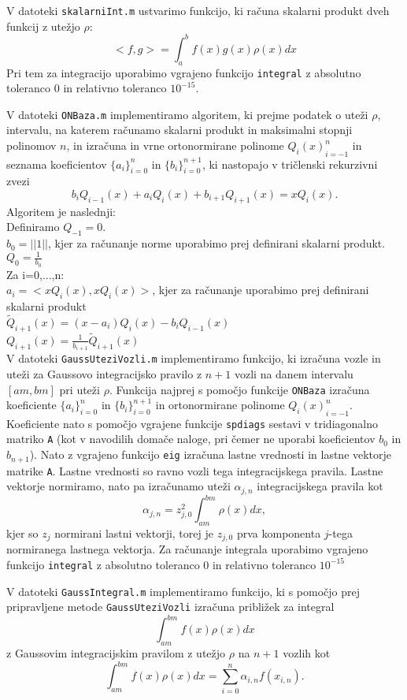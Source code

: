 \documentclass[a4paper,12pt]{article}
\begin{document}
V datoteki \texttt{skalarniInt.m} ustvarimo funkcijo, ki računa skalarni produkt 
dveh funkcij z utežjo $\rho$:
$$<f,g>=\int_a^b f(x)g(x)\rho(x)dx$$
Pri tem za integracijo uporabimo vgrajeno funkcijo \texttt{integral} z absolutno 
toleranco $0$ in relativno toleranco $10^{-15}$.

V datoteki \texttt{ONBaza.m} implementiramo algoritem, ki prejme podatek o uteži $\rho$, 
intervalu, na katerem računamo skalarni produkt in maksimalni stopnji polinomov $n$, in 
izračuna in vrne ortonormirane polinome ${Q_i(x)}_{i=-1}^n$ in seznama koeficientov 
$\{a_i\}_{i=0}^n$ in $\{b_i\}_{i=0}^{n+1}$, ki nastopajo v tričlenski rekurzivni zvezi
$$b_iQ_{i-1}(x)+a_iQ_i(x)+b_{i+1}Q_{i+1}(x)=xQ_i(x).$$
Algoritem je naslednji:\\
Definiramo $Q_{-1}=0$.\\
$b_0=||1||$, kjer za računanje norme uporabimo prej definirani skalarni produkt.\\
$Q_0=\frac{1}{b_0}$\\
Za i=0,...,n:\\
$a_i=<xQ_i(x),xQ_i(x)>$, kjer za računanje uporabimo prej definirani skalarni produkt\\
$\tilde{Q}_{i+1}(x)=(x-a_i)Q_i(x)-b_iQ_{i-1}(x)$\\
$Q_{i+1}(x)=\frac{1}{b_{i+1}}\tilde{Q}_{i+1}(x)$\\

V datoteki \texttt{GaussUteziVozli.m} implementiramo funkcijo, ki izračuna vozle in uteži 
za Gaussovo integracijsko pravilo z $n+1$ vozli na danem intervalu $[am,bm]$ pri uteži 
$\rho$. Funkcija najprej s pomočjo funkcije \texttt{ONBaza} izračuna koeficiente 
\(\{a_i\}_{i=0}^n\) in $\{b_i\}_{i=0}^{n+1}$ in ortonormirane polinome ${Q_i(x)}_{i=-1}^n$. 
Koeficiente nato s pomočjo vgrajene funkcije \texttt{spdiags} sestavi v tridiagonalno 
matriko \texttt{A} (kot v navodilih domače naloge, pri čemer ne uporabi koeficientov $b_0$ in $b_{n+1}$).
Nato z vgrajeno funkcijo \texttt{eig} izračuna lastne vrednosti in lastne vektorje matrike \texttt{A}.
Lastne vrednosti so ravno vozli tega integracijskega pravila. 
Lastne vektorje normiramo, nato pa izračunamo uteži $\alpha_{j,n}$ integracijskega pravila kot
$$\alpha_{j,n}=z_{j,0}^2\int_{am}^{bm}\rho(x)dx,$$
kjer so $z_j$ normirani lastni vektorji, torej je $z_{j,0}$ prva komponenta $j$-tega
normiranega lastnega vektorja. Za računanje integrala uporabimo vgrajeno funkcijo 
\texttt{integral} z absolutno toleranco $0$ in relativno toleranco $10^{-15}$

V datoteki \texttt{GaussIntegral.m} implementiramo funkcijo, ki s pomočjo prej pripravljene 
metode \texttt{GaussUteziVozli} izračuna približek za integral 
$$\int_{am}^{bm}f(x)\rho(x)dx$$
z Gaussovim integracijskim pravilom z utežjo $\rho$ na $n+1$ vozlih kot
$$\int_{am}^{bm}f(x)\rho(x)dx=\sum_{i=0}^n \alpha_{i,n}f(x_{i,n}).$$
\end{document}
